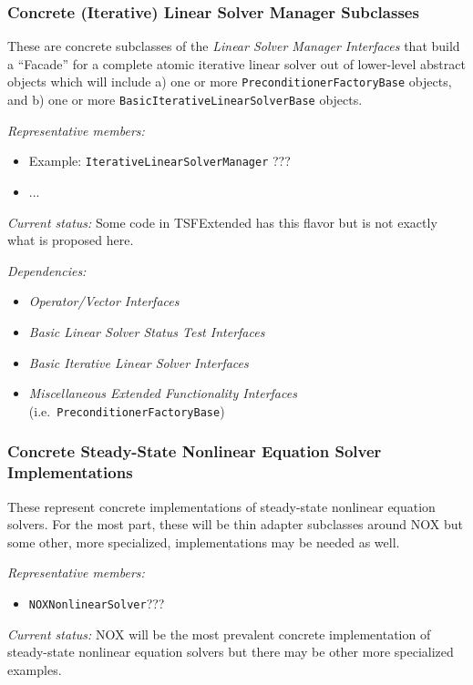 \documentclass[pdf,ps2pdf,11pt]{SANDreport}
\begin{document}
%
\subsubsection{Concrete (Iterative) Linear Solver Manager Subclasses}
%

These are concrete subclasses of the {}\textit{Linear Solver Manager
Interfaces} that build a ``Facade'' for a complete atomic iterative linear
solver out of lower-level abstract objects which will include a) one or more
{}\texttt{Preconditioner\-Factory\-Base} objects, and b) one or more
{}\texttt{Basic\-Iterative\-Linear\-Solver\-Base} objects.

{}\textit{Representative members:}
\begin{itemize}
%
{}\item Example: {}\texttt{IterativeLinearSolverManager} ??? 
%
{}\item ...
%
\end{itemize}

{}\textit{Current status:} Some code in TSFExtended has this flavor but is not
exactly what is proposed here.

{}\textit{Dependencies:}
\begin{itemize}
\item {}\textit{Operator/Vector Interfaces}
\item {}\textit{Basic Linear Solver Status Test Interfaces}
\item {}\textit{Basic Iterative Linear Solver Interfaces}
\item {}\textit{Miscellaneous Extended Functionality Interfaces}
(i.e.\ {}\texttt{Preconditioner\-Factory\-Base})
\end{itemize}

%
\subsubsection{Concrete Steady-State Nonlinear Equation Solver Implementations}
%

These represent concrete implementations of steady-state nonlinear equation
solvers.  For the most part, these will be thin adapter subclasses around NOX
but some other, more specialized, implementations may be needed as well.

{}\textit{Representative members:}
\begin{itemize}
%
{}\item {}\texttt{NOXNonlinearSolver}???
%
\end{itemize}

{}\textit{Current status:} NOX will be the most prevalent concrete
implementation of steady-state nonlinear equation solvers but there may be
other more specialized examples.
\end{document}
